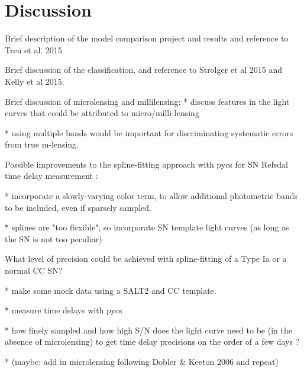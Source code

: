 \section{Discussion}\label{sec:Discussion}

Brief description of the model comparison project and results and reference to Treu et al. 2015

Brief discussion of the classification, and reference to Strolger et al 2015 and Kelly et al 2015.

Brief discussion of microlensing and millilensing: 
* discuss features in the light curves that could be attributed to micro/milli-lensing

* using multiple bands would be important for discriminating systematic errors from true m-lensing. 

Possible improvements to the spline-fitting approach with pycs for SN Refsdal time delay measurement :

* incorporate a slowly-varying color term, to allow additional photometric bands to be included, even if sparsely sampled. 

* splines are "too flexible", so incorporate SN template light curves (as long as the SN is not too peculiar)

What level of precision could be achieved with spline-fitting of a Type Ia or a normal CC SN? 

  * make some mock data using a SALT2 and CC template.

  * measure time delays with pycs

  * how finely sampled and how high S/N does the light curve need to be (in the absence of microlensing) to get time delay precisions on the order of a few days ?

  * (maybe: add in microlensing following Dobler \& Keeton 2006 and repeat) 





